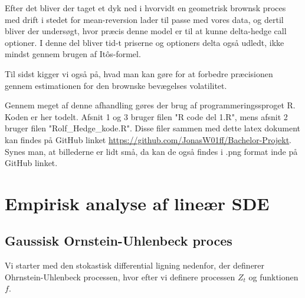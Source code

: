 \documentclass{article}
\theoremstyle{definition}
\theoremstyle{remark}
\begin{document}
Efter det bliver der taget et dyk ned i hvorvidt en geometrisk brownsk proces med drift i stedet for mean-reversion lader til passe med vores data, og dertil bliver der undersøgt, hvor præcis denne model er til at kunne delta-hedge call optioner. I denne del bliver tid-t priserne og optioners delta også udledt, ikke mindst gennem brugen af Itôs-formel.

Til sidst kigger vi også på, hvad man kan gøre for at forbedre præcisionen gennem estimationen for den brownske bevægelses volatilitet.

Gennem meget af denne afhandling gøres der brug af programmeringssproget R. Koden er her todelt. Afsnit 1 og 3 bruger filen "R code del 1.R", mens afsnit 2 bruger filen "Rolf\_Hedge\_kode.R". Disse filer sammen med dette latex dokument kan findes på GitHub linket \href{https://github.com/JonasW01ff/Bachelor-Projekt}{https://github.com/JonasW01ff/Bachelor-Projekt}. Synes man, at billederne er lidt små, da kan de også findes i .png format inde på GitHub linket.
\newpage
\section{Empirisk analyse af lineær SDE}
\subsection{Gaussisk Ornstein-Uhlenbeck proces}
Vi starter med den stokastisk differential ligning nedenfor, der definerer Ohrnstein-Uhlenbeck processen, hvor efter vi definere processen $Z_t$ og funktionen $f$.
\end{document}
